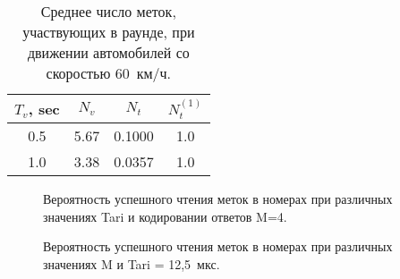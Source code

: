 \begin{table}[!t]
	\renewcommand{\arraystretch}{1.3}
	\caption{Среднее число меток, участвующих в раунде, при движении автомобилей со скоростью 60~км/ч.}
	\label{table:ch2_tags_num_per_round}
	\centering
	\begin{tabular}{|c|c|c|c|}
		\hline
		$T_v$, sec & $N_v$ & $N_t$ & $N_t^{(1)}$ \\\hline
		0.5 & 5.67 & 0.1000 & 1.0 \\\hline
		1.0 & 3.38 & 0.0357 & 1.0 \\\hline
		\end{tabular}
\end{table}


\begin{figure}[!t]
	\caption{Вероятность успешного чтения меток в номерах при различных значениях Tari и кодировании ответов M=4.}
	\label{fig:ch2_tag_identification_m4}
\end{figure}

\begin{figure}[!t]
	\caption{Вероятность успешного чтения меток в номерах при различных значениях M и Tari = 12,5~мкс.}
	\label{fig:ch2_tag_identification_tari125}
\end{figure}

